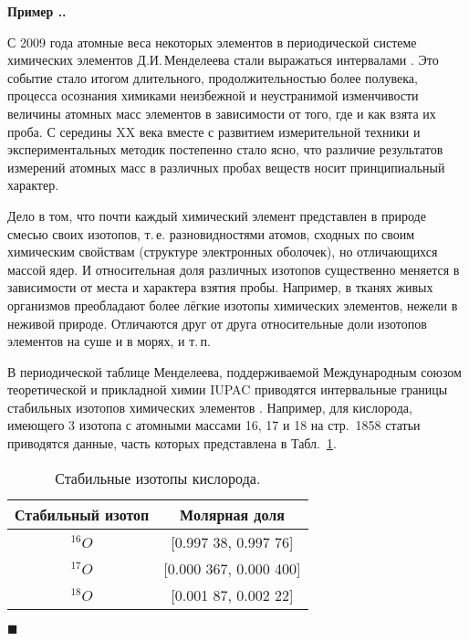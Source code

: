 \documentclass[a5paper,openany]{book}
\newcounter{ExmpNum}[section]
\renewcommand{\theExmpNum}{\thesection.\arabic{ExmpNum}}
\newenvironment{example}%
  {\refstepcounter{ExmpNum}%
  \par\addvspace{\medskipamount} 
  \noindent\textbf{Пример {\theExmpNum}.}
  }%
  {\hfill$\blacksquare$\par\medskip}
\begin{document}
  
\begin{example} 
С 2009 года атомные веса некоторых элементов в периодической системе химических 
элементов Д.И.\,Менделеева стали выражаться интервалами \cite{IUPAC-2016}. Это событие 
стало итогом длительного, продолжительностью более полувека, процесса осознания химиками 
неизбежной и неустранимой изменчивости величины атомных масс элементов в зависимости 
от того, где и как взята их проба. С середины XX века вместе с развитием измерительной 
техники и экспериментальных методик постепенно стало ясно, что различие результатов 
измерений атомных масс в различных пробах веществ носит принципиальный характер. 
  
Дело в том, что почти каждый химический элемент представлен в природе смесью своих 
изотопов, т.\,е. разновидностями атомов, сходных по своим химическим свойствам 
(структуре электронных оболочек), но отличающихся массой ядер. И относительная 
доля различных изотопов существенно меняется в зависимости от места и характера 
взятия пробы. Например, в тканях живых организмов преобладают более лёгкие изотопы 
химических элементов, нежели в неживой природе. Отличаются друг от друга 
относительные доли изотопов элементов на суше и в морях, и т.\,п. 
   
В периодической таблице Менделеева, поддерживаемой Международным союзом теоретической 
и прикладной химии IUPAC приводятся интервальные границы стабильных изотопов химических 
элементов \cite{IUPACtable}. Например, для кислорода, имеющего 3 изотопа с атомными 
массами 16, 17 и 18 на стр.~1858 статьи \cite{IUPAC-2016} приводятся данные, часть 
которых представлена в Табл.~\ref{IUPACOxygen}. 
  

\begin{table}[h!tb]
\centering
\caption{Стабильные изотопы кислорода.} 
	\begin{tabular}{|c|c|}
		\hline
		Стабильный  изотоп & Молярная доля \\
		\hline
		$^{16}O$ & [0.997 38, 0.997 76] \\
		$^{17}O$ & [0.000 367, 0.000 400] \\
		$^{18}O$ & [0.001 87, 0.002 22] \\			
		\hline
	\end{tabular}
\label{IUPACOxygen}
\end{table} 


\end{example}
\end{document}
